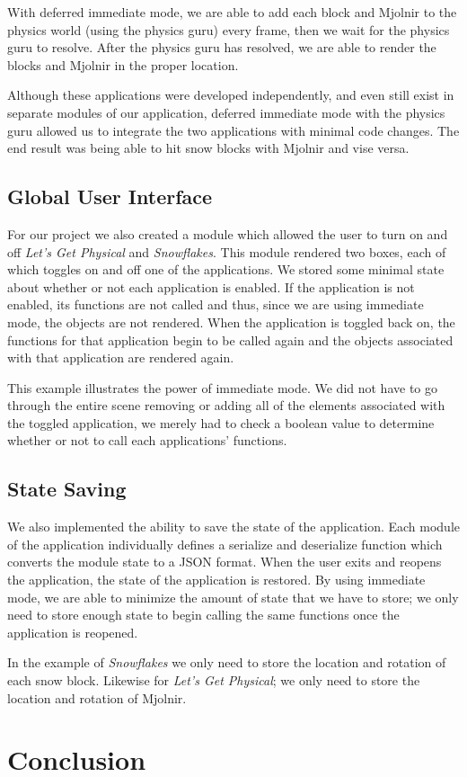 \documentclass[conference,12pt]{IEEEtran}
\begin{document}
With deferred immediate mode, we are able to add each block and Mjolnir to the
physics world (using the physics guru) every frame, then we wait for the physics
guru to resolve. After the physics guru has resolved, we are able to render
the blocks and Mjolnir in the proper location.

Although these applications were developed independently, and even still exist
in separate modules of our application, deferred immediate mode with the physics
guru allowed us to integrate the two applications with minimal code changes. The
end result was being able to hit snow blocks with Mjolnir and vise versa.

\subsection{Global User Interface}
For our project we also created a module which allowed the user to turn on and
off \textit{Let's Get Physical} and \textit{Snowflakes}. This module rendered
two boxes, each of which toggles on and off one of the applications. We stored
some minimal state about whether or not each application is enabled. If the
application is not enabled, its functions are not called and thus, since we are
using immediate mode, the objects are not rendered. When the application is
toggled back on, the functions for that application begin to be called again and
the objects associated with that application are rendered again.

This example illustrates the power of immediate mode. We did not have to go
through the entire scene removing or adding all of the elements associated with
the toggled application, we merely had to check a boolean value to determine
whether or not to call each applications' functions.

\subsection{State Saving}
We also implemented the ability to save the state of the application. Each
module of the application individually defines a serialize and deserialize
function which converts the module state to a JSON format. When the user exits
and reopens the application, the state of the application is restored. By using
immediate mode, we are able to minimize the amount of state that we have to
store; we only need to store enough state to begin calling the same functions
once the application is reopened.

In the example of \textit{Snowflakes} we only need to store the location and
rotation of each snow block. Likewise for \textit{Let's Get Physical}; we only
need to store the location and rotation of Mjolnir.

\section{Conclusion}\label{sec:conclusion}

{\printbibliography}
\end{document}

